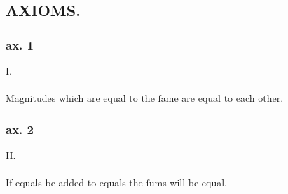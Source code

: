 \begin{minipage}{0.67\textwidth}
    \subsection[Axioms]{\centering \scshape{\LARGE{AXIOMS.}}}
    \label{subsec:axioms}

    \hfill

    \subsubsection{ax. 1}
    \begin{center}
        I.\label{ax1}\\
        \hfill\\
        Magnitudes which are equal to the ſame are equal to each other.\\
    \end{center}
    \subsubsection{ax. 2}
    \begin{center}
        II.\label{ax2}\\
        \hfill\\
        If equals be added to equals the ſums will be equal.\\
    \end{center}
\end{minipage}

\hfill

